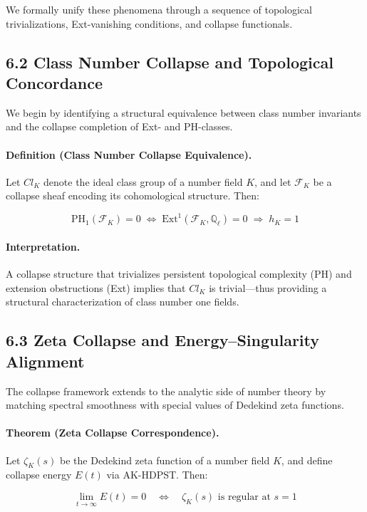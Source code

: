 \documentclass[11pt]{article}
\begin{document}
We formally unify these phenomena through a sequence of topological trivializations, Ext-vanishing conditions, and collapse functionals.

\subsection*{6.2 Class Number Collapse and Topological Concordance}

We begin by identifying a structural equivalence between class number invariants and the collapse completion of Ext- and PH-classes.

\paragraph{Definition (Class Number Collapse Equivalence).}
Let \( Cl_K \) denote the ideal class group of a number field \( K \), and let \( \mathcal{F}_K \) be a collapse sheaf encoding its cohomological structure. Then:

\[
\mathrm{PH}_1(\mathcal{F}_K) = 0 \;\Leftrightarrow\; \mathrm{Ext}^1(\mathcal{F}_K, \mathbb{Q}_\ell) = 0 \;\Rightarrow\; h_K = 1
\]

\paragraph{Interpretation.}
A collapse structure that trivializes persistent topological complexity (PH) and extension obstructions (Ext) implies that \( Cl_K \) is trivial—thus providing a structural characterization of class number one fields.

\subsection*{6.3 Zeta Collapse and Energy–Singularity Alignment}

The collapse framework extends to the analytic side of number theory by matching spectral smoothness with special values of Dedekind zeta functions.

\paragraph{Theorem (Zeta Collapse Correspondence).}
Let \( \zeta_K(s) \) be the Dedekind zeta function of a number field \( K \), and define collapse energy \( E(t) \) via AK-HDPST. Then:

\[
\lim_{t \to \infty} E(t) = 0 \quad \Leftrightarrow \quad \zeta_K(s) \text{ is regular at } s = 1
\]
\end{document}
